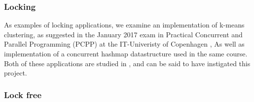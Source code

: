 
\subsubsection{Locking }
As examples of locking applications, we examine an implementation of k-means
clustering, as suggested in the January 2017 exam in Practical Concurrent and
Parallel Programming (PCPP) at the IT-Univeristy of Copenhagen \cite{kmeansexam,
kmeansexamcode}, As well as implementation of a concurrent hashmap datastructure
used in the same course. Both of these applications are studied in
\cite{mystery}, and can be said to have instigated this project.


\subsubsection{Lock free}

